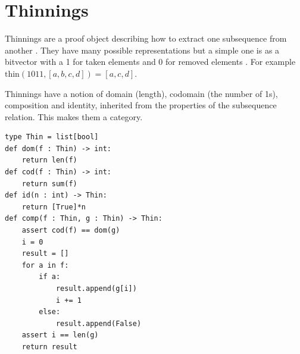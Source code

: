 \documentclass{article}%
\newcommand{\lift}{\text{lift}}
\begin{document}

\section{Thinnings}
Thinnings are a proof object describing how to extract one subsequence from another \cite{McBride_2018} \cite{zucker2026thinningssub}. They have many possible representations but a simple one is as a bitvector with a 1 for taken elements and 0 for removed elements \cite{gonccalves2025thinning}. For example $\text{thin}(1011,[a,b,c,d]) = [a,c,d]$.



Thinnings have a notion of domain (length), codomain (the number of 1s), composition and identity, inherited from the properties of the subsequence relation. This makes them a category.

\begin{lstlisting}
type Thin = list[bool]
def dom(f : Thin) -> int:
    return len(f)
def cod(f : Thin) -> int:
    return sum(f)
def id(n : int) -> Thin:
    return [True]*n
def comp(f : Thin, g : Thin) -> Thin:
    assert cod(f) == dom(g)
    i = 0 
    result = []
    for a in f:
        if a:
            result.append(g[i])
            i += 1
        else:
            result.append(False)
    assert i == len(g)
    return result
\end{lstlisting}





\end{document}

